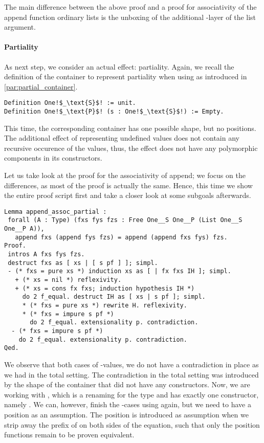 The main difference between the above proof and a proof for
associativity of the append function ordinary lists is the unboxing of
the additional -layer of the list argument.

\paragraph{Partiality}
As next step, we consider an actual effect: partiality.
Again, we recall the definition of the container to represent partiality
when using  as introduced in
\autoref{par:partial_container}.

\begin{verbatim}
Definition One!$_\text{S}$! := unit.
Definition One!$_\text{P}$! (s : One!$_\text{S}$!) := Empty.
\end{verbatim}

This time, the corresponding container has one possible shape, but no
positions.
The additional effect of representing undefined values does not
contain any recursive occurence of the  values, thus, the
effect does not have any polymorphic components in its constructors.

Let us take look at the proof for the associativity of append; we
focus on the differences, as most of the proof is actually the same.
Hence, this time we show the entire proof script first and take a
closer look at some subgoals afterwards.

\begin{verbatim}
Lemma append_assoc_partial :
 forall (A : Type) (fxs fys fzs : Free One__S One__P (List One__S One__P A)),
   append fxs (append fys fzs) = append (append fxs fys) fzs.
Proof.
 intros A fxs fys fzs.
 destruct fxs as [ xs | [ s pf ] ]; simpl.
 - (* fxs = pure xs *) induction xs as [ | fx fxs IH ]; simpl.
   + (* xs = nil *) reflexivity.
   + (* xs = cons fx fxs; induction hypothesis IH *)
     do 2 f_equal. destruct IH as [ xs | s pf ]; simpl.
     * (* fxs = pure xs *) rewrite H. reflexivity.
     * (* fxs = impure s pf *)
       do 2 f_equal. extensionality p. contradiction.
  - (* fxs = impure s pf *)
    do 2 f_equal. extensionality p. contradiction.
Qed.
\end{verbatim}

We observe that both cases of -values, we do not have a
contradiction in place as we had in the total setting.
The contradiction in the total setting was introduced by the shape of
the container that did not have any constructors.
Now, we are working with , which is a renaming for the
 type and has exactly one constructor, namely .
We can, however, finish the -cases using
 again, but we need to have a position as an
assumption.
The position is introduced as assumption when we strip away the prefix
of  on both sides of the equation, such that
only the position functions  remain to be proven equivalent.


